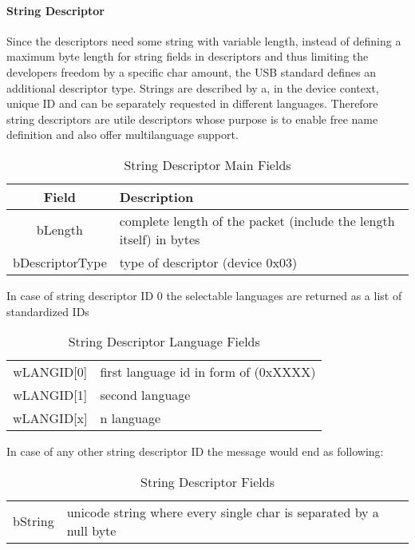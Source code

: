 \paragraph{String  Descriptor}
Since the descriptors need some string with variable length, instead of defining a maximum byte length for string fields in descriptors and thus 
limiting the developers freedom by a specific char amount, the USB standard defines an additional descriptor type. Strings are 
described by a, in the device context, unique ID and can be separately requested in  different languages. Therefore string descriptors 
are utile descriptors whose purpose is to enable free name definition and also offer multilanguage support.%

\begin{table}
\begin{tabular}{c|p{10 cm}}
Field & Description \\ \hline
bLength & complete length of the packet (include the length itself) in bytes \\
bDescriptorType & type of descriptor (device 0x03)
\end{tabular}
 \caption{String Descriptor Main Fields}
\end{table}

In case of string descriptor ID 0 the selectable languages are returned as a list of standardized IDs
\begin{table}
\begin{tabular}{c|p{10 cm}}
wLANGID[0] & first language id in form of (0xXXXX) \\
wLANGID[1] & second language \\
wLANGID[x] & n language 
\end{tabular}
 \caption{String Descriptor Language Fields}
\end{table}

In case of any other string descriptor ID the message would end as following:
\begin{table}
\begin{tabular}{c|p{10 cm}}
bString & unicode string where every single char is separated by a null byte
\end{tabular}
 \caption{String Descriptor Fields}
\end{table}


